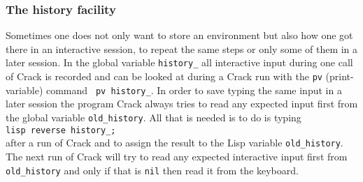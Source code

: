 \documentclass[12pt]{article}
\begin{document}
\subsubsection{The history facility}
Sometimes one does not only want to store an environment but also how one
got there in an interactive session, to repeat the same steps or only
some of them in a later session. 
In the global variable {\tt history\_} all interactive
input during one call of {\sc Crack} is recorded and can be looked at
during a {\sc Crack} run with the {\tt pv} (print-variable) command {\tt
pv history\_}. In order to save typing the same input in a later
session the program {\sc Crack} always tries to read any expected input
first from the global variable {\tt old\_history}. All that is needed
is to do is typing\\
{\tt lisp reverse history\_;}\\
after a run of {\sc Crack} and to assign the result to the {\sc Lisp}
variable {\tt old\_history}. The next run of {\sc Crack} will try to read
any expected interactive input first from {\tt old\_history} and only
if that is {\tt nil} then read it from the keyboard.
\end{document}
